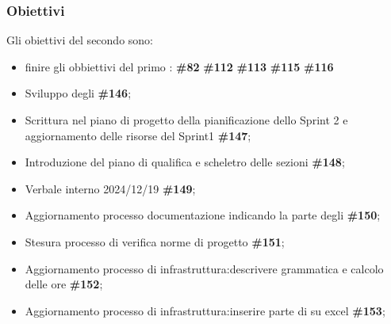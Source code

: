 \subsubsection{Obiettivi}

Gli obiettivi del secondo  sono:
\begin{itemize}
    \item finire gli obbiettivi del primo : \textbf{\#82} \textbf{\#112} \textbf{\#113} \textbf{\#115} \textbf{\#116}
    \item Sviluppo degli  \textbf{\#146};
    \item Scrittura nel piano di progetto della pianificazione dello Sprint 2 e aggiornamento delle risorse del Sprint1 \textbf{\#147};
    \item Introduzione del piano di qualifica e scheletro delle sezioni \textbf{\#148};
    \item Verbale interno 2024/12/19 \textbf{\#149};
    \item Aggiornamento processo documentazione indicando la parte degli  \textbf{\#150};
    \item Stesura processo di verifica norme di progetto \textbf{\#151};
    \item Aggiornamento processo di infrastruttura:descrivere  grammatica e calcolo delle ore \textbf{\#152};
    \item Aggiornamento processo di infrastruttura:inserire parte di  su excel \textbf{\#153};
\end{itemize}
